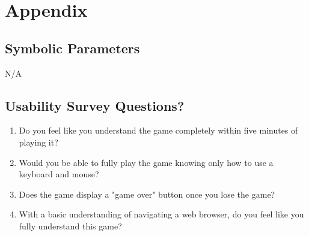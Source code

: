 \documentclass[12pt, titlepage]{article}
\begin{document}
\newpage

\section{Appendix}

\subsection{Symbolic Parameters}

N/A

\subsection{Usability Survey Questions?}

\begin{enumerate}
    \item Do you feel like you understand the game completely within five minutes of playing it?
    \item Would you be able to fully play the game knowing only how to use a keyboard and mouse?
    \item Does the game display a "game over" button once you lose the game?
    \item With a basic understanding of navigating a web browser, do you feel like you fully understand this game?
\end{enumerate}
\end{document}
